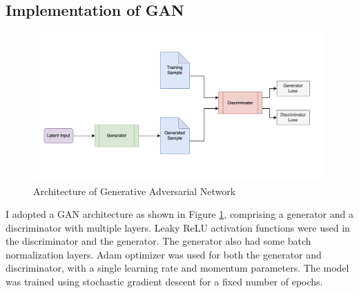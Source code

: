 \documentclass{article}
\begin{document}
\subsection{Implementation of GAN}
\begin{figure}[ht]
\vskip 0.2in
\begin{center}
\centerline{\includegraphics[width=\columnwidth]{images/gan_architecture.png}}
\caption{Architecture of Generative Adversarial Network}
\label{gan-architecture}
\end{center}
\vskip -0.2in
\end{figure}

I adopted a GAN architecture as shown in Figure \ref{gan-architecture}, comprising a generator and a discriminator with multiple layers. Leaky ReLU activation functions were used in the discriminator and the generator. The generator also had some batch normalization layers. Adam optimizer was used for both the generator and discriminator, with a single learning rate and momentum parameters. The model was trained using stochastic gradient descent for a fixed number of epochs.
\end{document}
